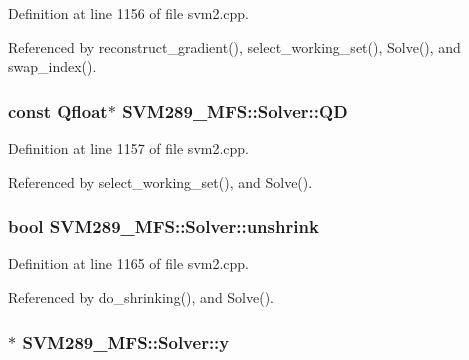 Definition at line 1156 of file svm2.\+cpp.



Referenced by reconstruct\+\_\+gradient(), select\+\_\+working\+\_\+set(), Solve(), and swap\+\_\+index().

\subsubsection[{\texorpdfstring{QD}{QD}}]{\setlength{\rightskip}{0pt plus 5cm}const {\bf Qfloat}$\ast$ S\+V\+M289\+\_\+\+M\+F\+S\+::\+Solver\+::\+QD\hspace{0.3cm}{\ttfamily [protected]}}\hypertarget{class_s_v_m289___m_f_s_1_1_solver_a5bb379d32ebad294ad384244fee7e8a5}{}\label{class_s_v_m289___m_f_s_1_1_solver_a5bb379d32ebad294ad384244fee7e8a5}


Definition at line 1157 of file svm2.\+cpp.



Referenced by select\+\_\+working\+\_\+set(), and Solve().

\subsubsection[{\texorpdfstring{unshrink}{unshrink}}]{\setlength{\rightskip}{0pt plus 5cm}bool S\+V\+M289\+\_\+\+M\+F\+S\+::\+Solver\+::unshrink\hspace{0.3cm}{\ttfamily [protected]}}\hypertarget{class_s_v_m289___m_f_s_1_1_solver_a78b071d4004e114f5b6b89839ca99b58}{}\label{class_s_v_m289___m_f_s_1_1_solver_a78b071d4004e114f5b6b89839ca99b58}


Definition at line 1165 of file svm2.\+cpp.



Referenced by do\+\_\+shrinking(), and Solve().

\subsubsection[{\texorpdfstring{y}{y}}]{$\ast$ S\+V\+M289\+\_\+\+M\+F\+S\+::\+Solver\+::y\hspace{0.3cm}{\ttfamily [protected]}}\hypertarget{class_s_v_m289___m_f_s_1_1_solver_ab9586d6d550d7806b9582b9279217ff5}{}\label{class_s_v_m289___m_f_s_1_1_solver_ab9586d6d550d7806b9582b9279217ff5}


